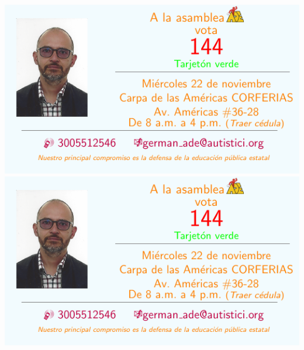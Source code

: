 \documentclass[10pt,letterpaper]{minimal}
\begin{document}
\begin{center}
\hspace{1mm}\includegraphics[scale=1]{Tarjeta.pdf} \includegraphics[scale=1]{Tarjeta.pdf} \vspace{1mm}


\end{center}
\end{document}
